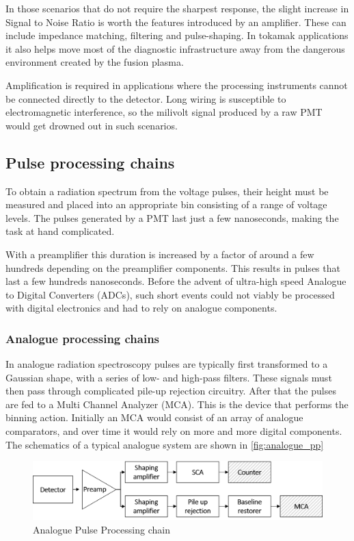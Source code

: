 In those scenarios that do not require the sharpest response,
the slight increase in Signal to Noise Ratio is worth the 
features introduced by an amplifier. These can include
impedance matching, filtering and pulse-shaping.
In tokamak applications it also helps move most of the 
diagnostic infrastructure away from the dangerous environment
created by the fusion plasma. 


Amplification is required in applications where the processing
instruments cannot be connected directly to the detector.
Long wiring is susceptible to electromagnetic interference, 
so the milivolt signal produced by a raw PMT would 
get drowned out in such scenarios.

\subsection{Pulse processing chains}

To obtain a radiation spectrum from the voltage pulses,
their height must be measured and
placed into an appropriate bin consisting of a range of voltage levels.
The pulses generated by a PMT last just a few nanoseconds,
making the task at hand complicated.


With a preamplifier this duration is increased by a factor of around
a few hundreds depending on the preamplifier components.
This results in pulses that last a few hundreds nanoseconds.
Before the advent of ultra-high speed Analogue to Digital Converters (ADCs),
such short events could not viably be processed with digital 
electronics and had to rely on analogue components.

\subsubsection{Analogue processing chains}

In analogue radiation spectroscopy
pulses are typically first transformed to a Gaussian shape,
with a series of low- and high-pass filters.
These signals must then pass through complicated pile-up
rejection circuitry. After that the pulses 
are fed to a Multi Channel Analyzer (MCA).
This is the device that performs the binning action.
Initially an MCA would consist of an array of 
analogue comparators, and over time it would rely 
on more and more digital components.
The schematics of a typical analogue system are shown in \autoref{fig:analogue_pp}
\begin{figure}[H]
  \centering
  \includegraphics[width=\linewidth]{media/analog_pulse_processing.png}
  \caption{Analogue Pulse Processing chain}
  \label{fig:analogue_pp}
\end{figure}



